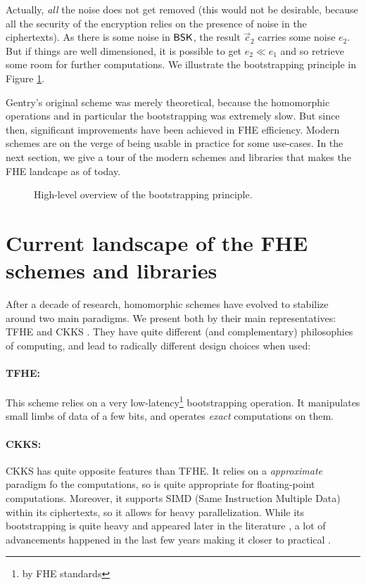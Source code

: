 Actually, \textit{all} the noise does not get removed (this would not be desirable, because all the security of the encryption relies on the presence of noise in the ciphertexts). As there is some noise in $\textsf{BSK}$, the result $\vec c_2$ carries some noise $e_2$. But if things are well dimensioned, it is possible to get $e_2 \ll e_1$ and so retrieve some room for further computations. We illustrate the bootstrapping principle in Figure \ref{fig:bootstrapping_principle}.


Gentry's original scheme was merely theoretical, because the homomorphic operations and in particular the bootstrapping was extremely slow. But since then, significant improvements have been achieved in FHE efficiency. Modern schemes are on the verge of being usable in practice for some use-cases. In the next section, we give a tour of the modern schemes and libraries that makes the FHE landcape as of today.



\begin{figure}
	\centering
	
	\caption{High-level overview of the bootstrapping principle.}
	\label{fig:bootstrapping_principle}
\end{figure}


\section{Current landscape of the FHE schemes and libraries}
\label{sec:landscape}

After a decade of research, homomorphic schemes have evolved to stabilize around two main paradigms. We present both by their main representatives: TFHE \cite{JC:CGGI20} and CKKS \cite{AC:CKKS17}. They have quite different (and complementary) philosophies of computing, and lead to radically different design choices when used:


\paragraph{TFHE:} This scheme relies on a very low-latency\footnote{by FHE standards} bootstrapping operation. It manipulates small limbs of data of a few bits, and operates \textit{exact} computations on them.


\paragraph{CKKS:} CKKS has quite opposite features than TFHE. It relies on a \textit{approximate} paradigm fo the computations, so is quite appropriate for floating-point computations. Moreover, it supports SIMD (Same Instruction Multiple Data) within its ciphertexts, so it allows for heavy parallelization. While its bootstrapping is quite heavy and appeared later in the literature \cite{EC:CHKKS18}, a lot of advancements happened in the last few years making it closer to practical \cite{EC:CheChiSon19, RSA:HanKi20, AC:KPKKM22}.


